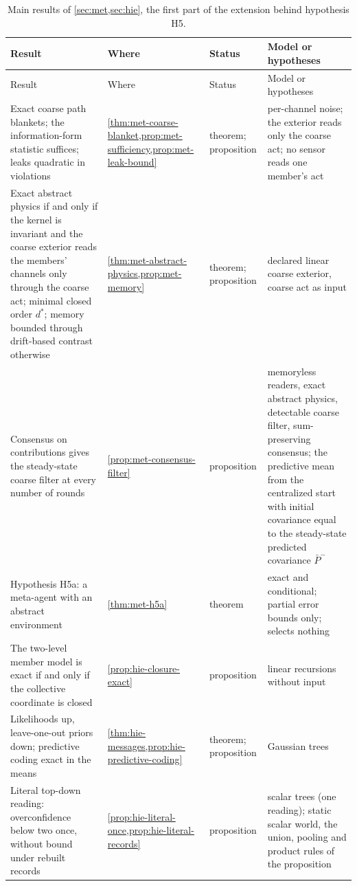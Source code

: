 \begingroup
\small
\setlength{\tabcolsep}{3pt}
\begin{longtable}{@{}>{\raggedright\arraybackslash}p{}>{\raggedright\arraybackslash}p{}>{\raggedright\arraybackslash}p{}>{\raggedright\arraybackslash}p{}@{}}
\caption{Main results of \cref{sec:met,sec:hie}, the first part of the extension behind hypothesis H5.}\label{tab:int-results-c}\\
\toprule
Result & Where & Status & Model or hypotheses\\
\midrule
\endfirsthead
\toprule
Result & Where & Status & Model or hypotheses\\
\midrule
\endhead
\bottomrule
\endfoot
Exact coarse path blankets; the information-form statistic suffices; leaks quadratic in violations & \cref{thm:met-coarse-blanket,prop:met-sufficiency,prop:met-leak-bound} & theorem; proposition & per-channel noise; the exterior reads only the coarse act; no sensor reads one member's act\\
Exact abstract physics if and only if the kernel is invariant and the coarse exterior reads the members' channels only through the coarse act; minimal closed order $d^\ast$; memory bounded through drift-based contrast otherwise & \cref{thm:met-abstract-physics,prop:met-memory} & theorem; proposition & declared linear coarse exterior, coarse act as input\\
Consensus on contributions gives the steady-state coarse filter at every number of rounds & \cref{prop:met-consensus-filter} & proposition & memoryless readers, exact abstract physics, detectable coarse filter, sum-preserving consensus; the predictive mean from the centralized start with initial covariance equal to the steady-state predicted covariance $\bar P^-$\\
Hypothesis H5a: a meta-agent with an abstract environment & \cref{thm:met-h5a} & theorem & exact and conditional; partial error bounds only; selects nothing\\
\addlinespace[2pt]
The two-level member model is exact if and only if the collective coordinate is closed & \cref{prop:hie-closure-exact} & proposition & linear recursions without input\\
Likelihoods up, leave-one-out priors down; predictive coding exact in the means & \cref{thm:hie-messages,prop:hie-predictive-coding} & theorem; proposition & Gaussian trees\\
Literal top-down reading: overconfidence below two once, without bound under rebuilt records & \cref{prop:hie-literal-once,prop:hie-literal-records} & proposition & scalar trees (one reading); static scalar world, the union, pooling and product rules of the proposition\\

\end{longtable}
